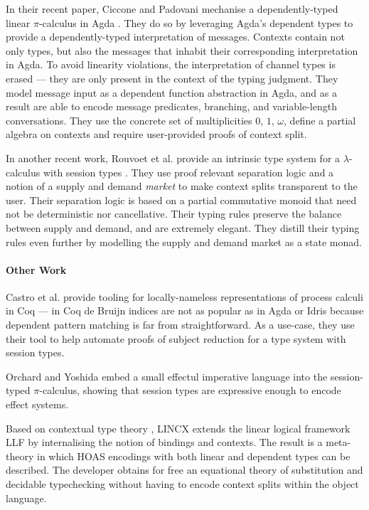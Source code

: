 \documentclass[sigplan,10pt,anonymous,review]{acmart}
\theoremstyle{definition}
\newcommand{\lambdacalc}{$\lambda$-calculus}
\newcommand{\picalc}{$\pi$-calculus}
\begin{document}
In their recent paper, Ciccone and Padovani mechanise a dependently-typed linear \picalc{} in Agda \cite{Ciccone}.
They do so by leveraging Agda's dependent types to provide a dependently-typed interpretation of messages.
Contexts contain not only types, but also the messages that inhabit their corresponding interpretation in Agda.
To avoid linearity violations, the interpretation of channel types is erased --- they are only present in the context of the typing judgment.
They model message input as a dependent function abstraction in Agda, and as a result are able to encode message predicates, branching, and variable-length conversations.
They use the concrete set of multiplicities $0$, $1$, $\omega$, define a partial algebra on contexts and require user-provided proofs of context split.

In another recent work, Rouvoet et al. provide an intrinsic type system for a \lambdacalc{} with session types \cite{Rouvoet2020}.
They use proof relevant separation logic and a notion of a supply and demand \emph{market} to make context splits transparent to the user.
Their separation logic is based on a partial commutative monoid that need not be deterministic nor cancellative.
Their typing rules preserve the balance between supply and demand, and are extremely elegant.
They distill their typing rules even further by modelling the supply and demand market as a state monad.

\paragraph{Other Work}

Castro et al. \cite{Castro2020} provide tooling for locally-nameless representations of process calculi in Coq  --- in Coq de Bruijn indices are not as popular as in Agda or Idris because dependent pattern matching is far from straightforward.
As a use-case, they use their tool to help automate proofs of subject reduction for a type system with session types.

Orchard and Yoshida \cite{OrchardY16} embed a small effectul imperative language into the session-typed \picalc{}, showing that session types are expressive enough to encode effect systems.

Based on contextual type theory \cite{Pientkaa, Pientka}, LINCX \cite{Georges2017} extends the linear logical framework LLF \cite{Cervesato1996} by internalising the notion of bindings and contexts.
The result is a meta-theory in which HOAS encodings with both linear and dependent types can be described.
The developer obtains for free an equational theory of substitution and decidable typechecking without having to encode context splits within the object language.
\end{document}
